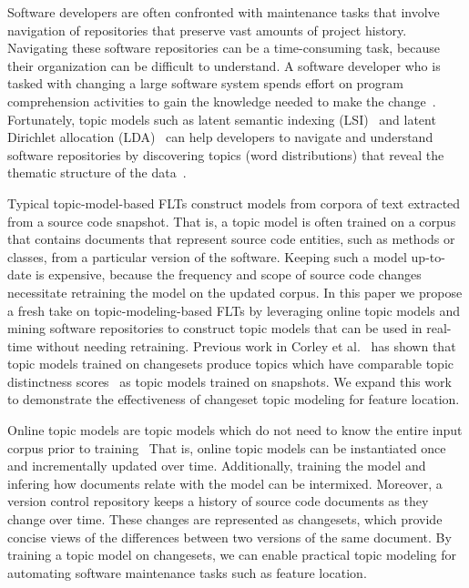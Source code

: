 
\begin{comment}
Points to make:

- Why FLTs matter
- What the problem is
- What our solution is
- How we evaluate it
- Contrib
- Organization
\end{comment}

Software developers are often confronted with maintenance tasks that involve navigation of repositories that preserve vast amounts of project history.
Navigating these software repositories can be a time-consuming task, because their organization can be difficult to understand.
A software developer who is tasked with changing a large software system spends effort on program comprehension activities to gain the knowledge needed to make the change~\cite{Corbi:1989}.
Fortunately, topic models such as
latent semantic indexing (LSI)~\cite{Deerwester-etal:1990} and
latent Dirichlet allocation (LDA)~\cite{Blei-etal:2003}
can help developers to navigate and understand software repositories
by discovering topics (word distributions) that reveal the thematic structure
of the data~\cite{Linstead-etal:2007,Thomas-etal:2011,Hindle-etal:2012}.

Typical topic-model-based FLTs construct models from corpora of text extracted from a source code snapshot.
That is, a topic model is often trained on a corpus that contains documents that
represent source code entities, such as methods or classes, from a particular version of the software.
Keeping such a model up-to-date is expensive,
because the frequency and scope of source code changes necessitate retraining the model on the updated corpus.
In this paper we propose a fresh take on topic-modeling-based FLTs
by leveraging online topic models and mining software repositories
to construct topic models that can be used in real-time without needing retraining.
Previous work in Corley et al.~\cite{Corley-etal:2014} has shown that
topic models trained on changesets produce topics which have
comparable topic distinctness scores~\cite{Thomas-etal:2011} as
topic models trained on snapshots.
We expand this work to demonstrate the effectiveness of changeset topic modeling for feature location.

Online topic models are topic models which do not need to know
the entire input corpus prior to training~\cite{Hoffman-etal:2010,Radim:2011}
That is, online topic models can be instantiated once and incrementally updated over time.
Additionally, training the model and infering how documents relate with the model
can be intermixed.
Moreover, a version control repository keeps a history of source code documents as they change over time.
These changes are represented as changesets,
which provide concise views of the differences between two versions of the same document.
By training a topic model on changesets, we can enable practical topic
modeling for automating software maintenance tasks such as feature
location.

